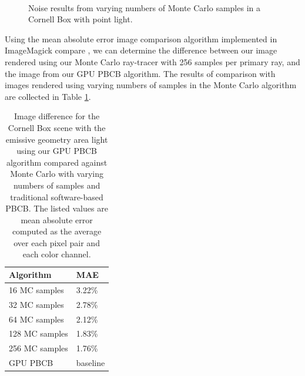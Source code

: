 \begin{figure}
   ~
   \captionfonts
   \caption[Monte Carlo noise]{Noise results from varying numbers of Monte Carlo samples in a Cornell Box with point light.}
   \label{fig:monte_carlo_noise}
\end{figure}

Using the mean absolute error image comparison algorithm implemented in ImageMagick compare \cite{bib:compare}, we can determine the difference between our image rendered using our Monte Carlo ray-tracer with 256 samples per primary ray, and the image from our GPU PBCB algorithm. The results of comparison with images rendered using varying numbers of samples in the Monte Carlo algorithm are collected in Table \ref{tbl:compare}.

\begin{table}[h!]
   \centering
   \begin{tabular}{ | l | l | }
   \hline
   \textbf{Algorithm} & \textbf{MAE} \\ \hline
   16 MC samples & 3.22\% \\ \hline
   32 MC samples & 2.78\% \\ \hline
   64 MC samples & 2.12\% \\ \hline
   128 MC samples & 1.83\% \\ \hline
   256 MC samples & 1.76\% \\ \hline
   GPU PBCB & baseline \\ \hline
   \end{tabular}
   \captionfonts
   \caption[Monte Carlo vs. GPU PBCB image comparison]{Image difference for the Cornell Box scene with the emissive geometry area light using our GPU PBCB algorithm compared against Monte Carlo with varying numbers of samples and traditional software-based PBCB. The listed values are mean absolute error computed as the average over each pixel pair and each color channel.}
   \label{tbl:compare}
\end{table}

